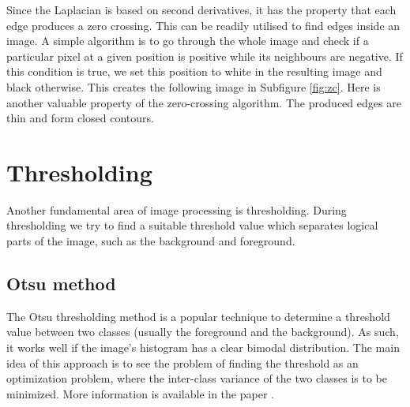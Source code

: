 \documentclass[
  digital,     %
  oneside,     %
  nosansbold,  %
  nocolorbold, %
  lof,         %
  lot,         %
]{fithesis4}
\begin{document}
Since the Laplacian is based on second derivatives, it has the property that
each edge produces a zero crossing. This can be readily utilised to find edges
inside an image. A simple algorithm is to go through the whole image and check
if a particular pixel at a given position is positive while its neighbours are
negative. If this condition is true, we set this position to white in the
resulting image and black otherwise. This creates the following image in
Subfigure \ref{fig:zc}. Here is another valuable property of the zero-crossing
algorithm. The produced edges are thin and form closed contours.

\section{Thresholding}

Another fundamental area of image processing is thresholding. During thresholding
we try to find a suitable threshold value which separates logical parts of the image,
such as the background and foreground.

\subsection{Otsu method}

The Otsu thresholding method is a popular technique to determine a threshold
value between two classes (usually the foreground and the background). As such,
it works well if the image's histogram has a clear bimodal distribution. The
main idea of this approach is to see the problem of finding the threshold as an
optimization problem, where the inter-class variance of the two classes is to be
minimized. More information is available in the paper \cite{otsu1979}.
\end{document}
